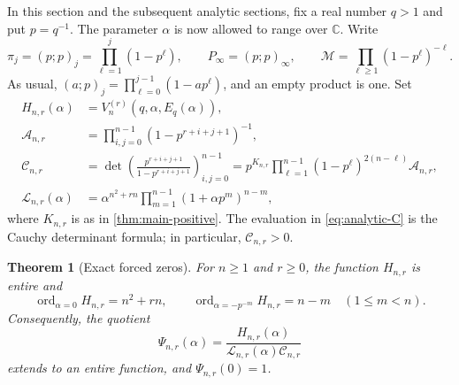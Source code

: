 \documentclass[11pt]{article}
\numberwithin{equation}{section}
\newtheorem{theorem}{Theorem}[section]
\theoremstyle{definition}
\theoremstyle{remark}
\newcommand{\C}{\mathbb{C}}
\begin{document}
In this section and the subsequent analytic sections, fix a real number
$q>1$ and put $p=q^{-1}$. The parameter $\alpha$ is now allowed to range
over $\C$. Write
\begin{equation}\label{eq:analytic-products}
 \pi_j=(p;p)_j=\prod_{\ell=1}^j(1-p^\ell),\qquad
 P_\infty=(p;p)_\infty,\qquad
 \mathcal M=\prod_{\ell\ge1}(1-p^\ell)^{-\ell}.
\end{equation}
As usual, $(a;p)_j=\prod_{\ell=0}^{j-1}(1-ap^\ell)$, and an empty
product is one. Set
\begin{align}
 H_{n,r}(\alpha)&=V_n^{(r)}(q,\alpha,E_q(\alpha)),\label{eq:analytic-H}\\
 \mathcal A_{n,r}
 &=\prod_{i,j=0}^{n-1}(1-p^{r+i+j+1})^{-1},\label{eq:analytic-A}\\
 \mathcal C_{n,r}
 &=\det\left(\frac{p^{r+i+j+1}}{1-p^{r+i+j+1}}\right)_{i,j=0}^{n-1}
 =p^{K_{n,r}}\prod_{\ell=1}^{n-1}(1-p^\ell)^{2(n-\ell)}
   \mathcal A_{n,r},\label{eq:analytic-C}\\
 \mathcal L_{n,r}(\alpha)
 &=\alpha^{n^2+rn}
   \prod_{m=1}^{n-1}(1+\alpha p^m)^{n-m},\label{eq:analytic-L}
\end{align}
where $K_{n,r}$ is as in \cref{thm:main-positive}.
The evaluation in \eqref{eq:analytic-C} is the Cauchy determinant formula;
in particular, $\mathcal C_{n,r}>0$.

\begin{theorem}[Exact forced zeros]\label{thm:forced-alpha-orders}
For $n\ge1$ and $r\ge0$, the function $H_{n,r}$ is entire and
\begin{equation}\label{eq:forced-alpha-orders}
 \operatorname{ord}_{\alpha=0}H_{n,r}=n^2+rn,\qquad
 \operatorname{ord}_{\alpha=-p^{-m}}H_{n,r}=n-m
 \quad(1\le m<n).
\end{equation}
Consequently, the quotient
\begin{equation}\label{eq:analytic-normalization}
 \Psi_{n,r}(\alpha)
 =\frac{H_{n,r}(\alpha)}
 {\mathcal L_{n,r}(\alpha)\mathcal C_{n,r}}
\end{equation}
extends to an entire function, and $\Psi_{n,r}(0)=1$.
\end{theorem}
\end{document}
